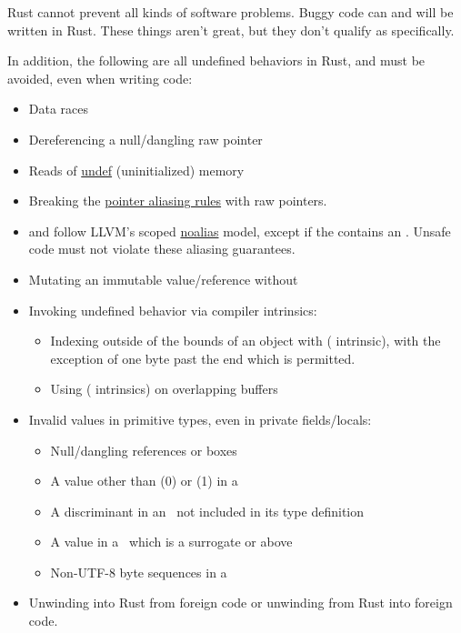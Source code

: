Rust cannot prevent all kinds of software problems. Buggy code can and will be written in Rust. These things aren't great, but they 
don't qualify as  specifically.

\blank

In addition, the following are all undefined behaviors in Rust, and must be avoided, even when writing  code:

\begin{itemize}
  \item{Data races}
  \item{Dereferencing a null/dangling raw pointer}
  \item{Reads of \href{http://llvm.org/docs/LangRef.html\#undefined-values}{undef} (uninitialized) memory}
  \item{Breaking the \href{http://llvm.org/docs/LangRef.html\#pointer-aliasing-rules}{pointer aliasing rules} with raw pointers.}
  \item{ and  follow LLVM's scoped \href{http://llvm.org/docs/LangRef.html\#noalias}{noalias} model, except if 
      the  contains an . Unsafe code must not violate these aliasing guarantees.}
  \item{Mutating an immutable value/reference without }
  \item{Invoking undefined behavior via compiler intrinsics:}
  \begin{itemize}
    \item{Indexing outside of the bounds of an object with  ( intrinsic), with the exception of one 
        byte past the end which is permitted.}
    \item{Using  ( intrinsics) on overlapping buffers}
  \end{itemize}
  \item{Invalid values in primitive types, even in private fields/locals:}
  \begin{itemize}
    \item{Null/dangling references or boxes}
    \item{A value other than  (0) or  (1) in a }
    \item{A discriminant in an \enum\ not included in its type definition}
    \item{A value in a \varchar\ which is a surrogate or above }
    \item{Non-UTF-8 byte sequences in a }
  \end{itemize}
  \item{Unwinding into Rust from foreign code or unwinding from Rust into foreign code.}
\end{itemize}

